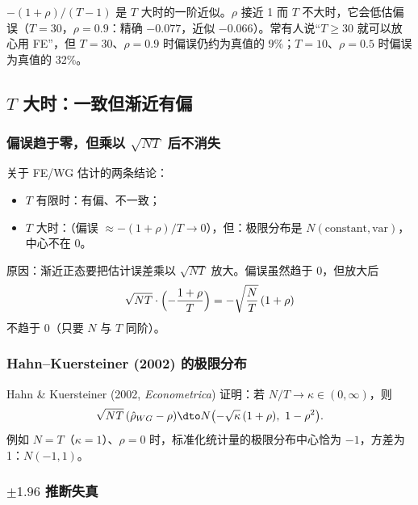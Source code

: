 \begin{note}[大 $T$ 近似会低估偏误]
$-(1+\rho)/(T-1)$ 是 $T$ 大时的一阶近似。$\rho$ 接近 1 而 $T$ 不大时，它会低估偏误（$T=30$，$\rho=0.9$：精确 $-0.077$，近似 $-0.066$）。常有人说“$T\ge30$ 就可以放心用 FE”，但 $T=30$、$\rho=0.9$ 时偏误仍约为真值的 9\%；$T=10$、$\rho=0.5$ 时偏误为真值的 32\%。
\end{note}

\subsection{\texorpdfstring{$T$}{T} 大时：一致但渐近有偏}

\subsubsection{偏误趋于零，但乘以 \texorpdfstring{$\sqrt{NT}$}{sqrt(NT)} 后不消失}

关于 FE/WG 估计的两条结论：
\begin{itemize}
  \item $T$ 有限时：有偏、不一致；
  \item $T$ 大时：（偏误 $\approx-(1+\rho)/T\to0$），但：极限分布是 $N(\text{constant},\text{var})$，中心不在 0。
\end{itemize}
原因：渐近正态要把估计误差乘以 $\sqrt{NT}$ 放大。偏误虽然趋于 0，但放大后
\[
\sqrt{NT}\cdot\Bigl(-\frac{1+\rho}{T}\Bigr)=-\sqrt{\frac NT}\,(1+\rho)
\]
不趋于 0（只要 $N$ 与 $T$ 同阶）。

\subsubsection{Hahn–Kuersteiner (2002) 的极限分布}

\begin{extend}[$N$、$T$ 同阶时的渐近分布]
Hahn \& Kuersteiner (2002, \emph{Econometrica}) 证明：若 $N/T\to\kappa\in(0,\infty)$，则
\[
\sqrt{NT}\,(\hat\rho_{WG}-\rho)\dto N\bigl(-\sqrt{\kappa}\,(1+\rho),\ 1-\rho^2\bigr).
\]
例如 $N=T$（$\kappa=1$）、$\rho=0$ 时，标准化统计量的极限分布中心恰为 $-1$，方差为 1：$N(-1,1)$。
\end{extend}

\subsubsection{\texorpdfstring{$\pm1.96$}{+-1.96} 推断失真}

